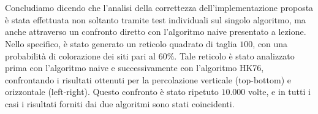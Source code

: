 \\\\
\noindent
Concludiamo dicendo che l'analisi della correttezza dell'implementazione proposta è stata effettuata non soltanto tramite test individuali sul singolo algoritmo, ma anche attraverso un confronto diretto con l'algoritmo naive presentato a lezione. Nello specifico, è stato generato un reticolo quadrato di taglia $100$, con una probabilità di colorazione dei siti pari al $60\%$. Tale reticolo è stato analizzato prima con l'algoritmo naive e successivamente con l'algoritmo HK76, confrontando i risultati ottenuti per la percolazione verticale (top-bottom) e orizzontale (left-right). Questo confronto è stato ripetuto $10.000$ volte, e in tutti i casi i risultati forniti dai due algoritmi sono stati coincidenti. 
